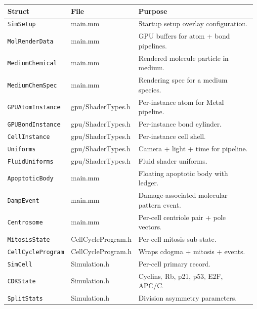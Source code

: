 \documentclass[11pt,letterpaper,twoside,openany]{book}
\newcommand{\code}[1]{\texttt{#1}}
\begin{document}
\begin{longtable}{p{4.4cm}p{3.0cm}p{7.0cm}}
\toprule
\textbf{Struct} & \textbf{File} & \textbf{Purpose}\\ \midrule
\code{SimSetup}           & main.mm                             & Startup setup overlay configuration.\\
\code{MolRenderData}      & main.mm                             & GPU buffers for atom + bond pipelines.\\
\code{MediumChemical}     & main.mm                             & Rendered molecule particle in medium.\\
\code{MediumChemSpec}     & main.mm                             & Rendering spec for a medium species.\\
\code{GPUAtomInstance}    & gpu/ShaderTypes.h                   & Per-instance atom for Metal pipeline.\\
\code{GPUBondInstance}    & gpu/ShaderTypes.h                   & Per-instance bond cylinder.\\
\code{CellInstance}       & gpu/ShaderTypes.h                   & Per-instance cell shell.\\
\code{Uniforms}           & gpu/ShaderTypes.h                   & Camera + light + time for pipeline.\\
\code{FluidUniforms}      & gpu/ShaderTypes.h                   & Fluid shader uniforms.\\
\code{ApoptoticBody}      & main.mm                             & Floating apoptotic body with ledger.\\
\code{DampEvent}          & main.mm                             & Damage-associated molecular pattern event.\\
\code{Centrosome}         & main.mm                             & Per-cell centriole pair + pole vectors.\\
\code{MitosisState}       & CellCycleProgram.h                  & Per-cell mitosis sub-state.\\
\code{CellCycleProgram}   & CellCycleProgram.h                  & Wraps cdogma + mitosis + events.\\
\code{SimCell}            & Simulation.h                        & Per-cell primary record.\\
\code{CDKState}           & Simulation.h                        & Cyclins, Rb, p21, p53, E2F, APC/C.\\
\code{SplitStats}         & Simulation.h                        & Division asymmetry parameters.\\

\end{longtable}
\end{document}
